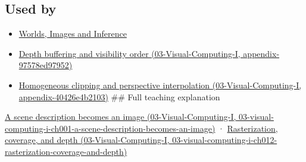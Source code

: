 \subsection{Used by}\label{appendix-ed3f9bc298fe-used-by}

\begin{itemize}
\item
  \href{Continuous\%20Notes/University\%20-\%20Worlds,\%20Images\%20and\%20Inference\%20-\%20Graphics,\%20Vision\%20and\%20Photography}{Worlds, Images and Inference}
\item
  \href{../03-Visual-Computing-I/main.pdf\#nameddest=appendix-97578ed97952}{Depth buffering and visibility order (03-Visual-Computing-I, appendix-97578ed97952)}
\item
  \href{../03-Visual-Computing-I/main.pdf\#nameddest=appendix-40426e4b2103}{Homogeneous clipping and perspective interpolation (03-Visual-Computing-I, appendix-40426e4b2103)} \#\# Full teaching explanation
\end{itemize}

\href{../03-Visual-Computing-I/main.pdf\#nameddest=03-visual-computing-i-ch001-a-scene-description-becomes-an-image}{A scene description becomes an image (03-Visual-Computing-I, 03-visual-computing-i-ch001-a-scene-description-becomes-an-image)} · \href{../03-Visual-Computing-I/main.pdf\#nameddest=03-visual-computing-i-ch012-rasterization-coverage-and-depth}{Rasterization, coverage, and depth (03-Visual-Computing-I, 03-visual-computing-i-ch012-rasterization-coverage-and-depth)}
